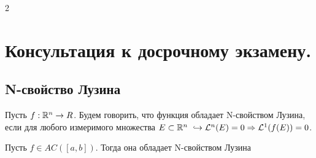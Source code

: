 2\section{Консультация к досрочному экзамену.}

\subsection{N-свойство Лузина}

\begin{definition}
    Пусть $f: \mathbb{R}^n \rightarrow R$. Будем говорить, что функция обладает N-свойством Лузина, если для любого измеримого множества $E \subset \R^n \ \hookrightarrow \LL^n(E) = 0 \Rightarrow \LL^1(f(E)) = 0$. 
\end{definition}

\begin{theorem}
    Пусть $f \in AC([a, b])$. Тогда она обладает N-свойством Лузина
\end{theorem}

